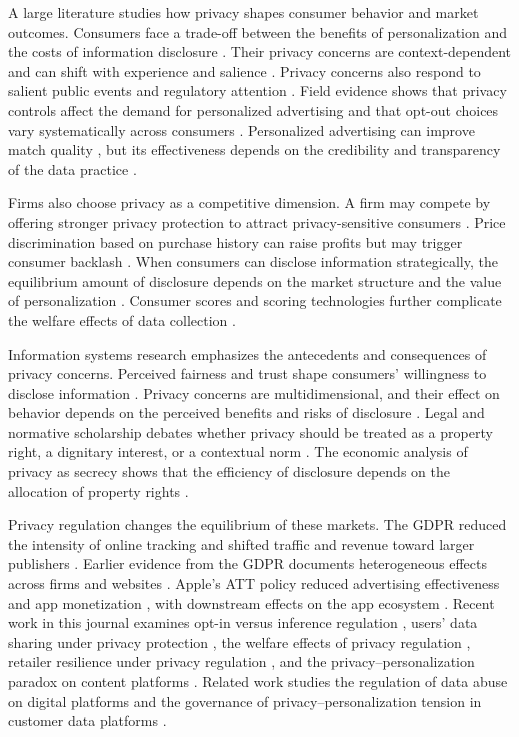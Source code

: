 A large literature studies how privacy shapes consumer behavior and market outcomes. Consumers face a trade-off between the benefits of personalization and the costs of information disclosure \cite{acquisti2016}. Their privacy concerns are context-dependent and can shift with experience and salience \cite{acquisti2015}. Privacy concerns also respond to salient public events and regulatory attention \cite{goldfarb2012}. Field evidence shows that privacy controls affect the demand for personalized advertising \cite{tucker2014} and that opt-out choices vary systematically across consumers \cite{johnson2020}. Personalized advertising can improve match quality \cite{bleier2015}, but its effectiveness depends on the credibility and transparency of the data practice \cite{boerman2017}.

Firms also choose privacy as a competitive dimension. A firm may compete by offering stronger privacy protection to attract privacy-sensitive consumers \cite{casadesus2015}. Price discrimination based on purchase history can raise profits but may trigger consumer backlash \cite{acquisti2005}. When consumers can disclose information strategically, the equilibrium amount of disclosure depends on the market structure and the value of personalization \cite{ichihashi2020}. Consumer scores and scoring technologies further complicate the welfare effects of data collection \cite{bonatti2020}.

Information systems research emphasizes the antecedents and consequences of privacy concerns. Perceived fairness and trust shape consumers' willingness to disclose information \cite{culnan1999,dinev2006}. Privacy concerns are multidimensional, and their effect on behavior depends on the perceived benefits and risks of disclosure \cite{malhotra2004}. Legal and normative scholarship debates whether privacy should be treated as a property right, a dignitary interest, or a contextual norm \cite{nissenbaum2009,samuelson2000}. The economic analysis of privacy as secrecy shows that the efficiency of disclosure depends on the allocation of property rights \cite{hermalin2006}.

Privacy regulation changes the equilibrium of these markets. The GDPR reduced the intensity of online tracking and shifted traffic and revenue toward larger publishers \cite{goldberg2024}. Earlier evidence from the GDPR documents heterogeneous effects across firms and websites \cite{aridor2020}. Apple's ATT policy reduced advertising effectiveness and app monetization \cite{aridor2024,kesler2023}, with downstream effects on the app ecosystem \cite{cheyre2024}. Recent work in this journal examines opt-in versus inference regulation \cite{li2026}, users' data sharing under privacy protection \cite{kang2025}, the welfare effects of privacy regulation \cite{lin2021}, retailer resilience under privacy regulation \cite{chen2026}, and the privacy--personalization paradox on content platforms \cite{zhang2026}. Related work studies the regulation of data abuse on digital platforms \cite{wang2023} and the governance of privacy--personalization tension in customer data platforms \cite{mihaylova2026}.

